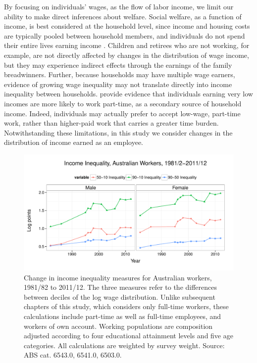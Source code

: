 By focusing on individuals' wages, as the flow of labor income, we limit our ability to make direct inferences about welfare. Social welfare, as a function of income, is best considered at the household level, since income and housing costs are typically pooled between household members, and individuals do not spend their entire lives earning income \citep{Richardson1999,Borland1999}. Children and retirees who are not working, for example, are not directly affected by changes in the distribution of wage income, but they may experience indirect effects through the earnings of the family breadwinners. Further, because households may have multiple wage earners, evidence of growing wage inequality may not translate directly into income inequality between households. \citet{Richardson1999} provide evidence that individuals earning very low incomes are more likely to work part-time, as a secondary source of household income. Indeed, individuals may actually prefer to accept low-wage, part-time work, rather than higher-paid work that carries a greater time burden. Notwithstanding these limitations, in this study we consider changes in the distribution of income earned as an employee.

\begin{figure}[h]
  \centering
  \includegraphics[width=\textwidth]{../figure/ineq_time.pdf}
  \caption{Change in income inequality measures for Australian workers, 1981/82 to 2011/12. The three measures refer to the differences between deciles of the log wage distribution. Unlike subsequent chapters of this study, which considers only full-time workers, these calculations include part-time as well as full-time employees, and workers of own account. Working populations are composition adjusted according to four educational attainment levels and five age categories. All calculations are weighted by survey weight. Source: ABS cat. 6543.0, 6541.0, 6503.0.}
  \label{fig:ineq}
\end{figure}

